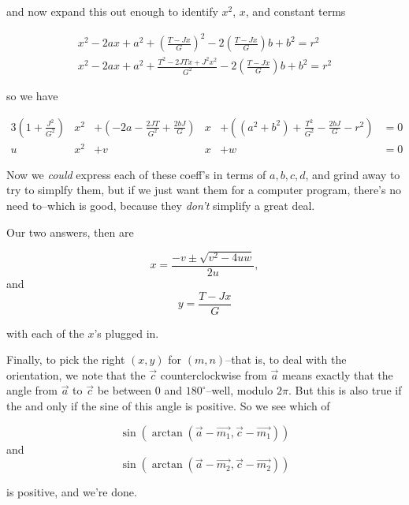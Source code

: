 \documentclass[12pt]{article}
\begin{document}
and now expand this out enough to identify $x^2$, $x$, and constant
terms

\begin{gather}
x^2-2ax+a^2+{\left(\frac{T-Jx}{G}\right)}^2
-2\left(\frac{T-Jx}{G}\right)b+b^2=r^2\\
x^2-2ax+a^2+\frac{T^2-2JTx+J^2x^2}{G^2}
-2\left(\frac{T-Jx}{G}\right)b+b^2=r^2
\end{gather}

so we have

\begin{alignat}{3}
\left(1+\frac{J^2}{G^2}\right)&x^2 & 
	+\left(-2a-\frac{2JT}{G^2}+\frac{2bJ}{G}\right)&x &
	+\left((a^2+b^2)+\frac{T^2}{G^2}-\frac{2bJ}{G}-r^2\right)& = 0\\
u&x^2 &+ v&x &+ w& = 0
\end{alignat}


Now we {\em could} express each of these coeff's in terms of $a,b,c,d$,
and grind away to try to simplfy them, but if we just want them for a
computer program, there's no need to--which is good, because they {\em
don't} simplify a great deal.

Our {\rm two} answers, then are

\begin{equation}
x = \frac{-v\pm\sqrt{v^2-4uw}}{2u},
\end{equation}
and
\begin{equation}
y = \frac{T-Jx}{G}
\end{equation}

with each of the $x$'s plugged in.

Finally, to pick the right $(x,y)$ for $(m,n)$--that is, to deal with
the orientation, we note that the $\vec{c}$ counterclockwise from
$\vec{a}$ means exactly that the angle from $\vec{a}$ to $\vec{c}$ be
between $0$ and ${180}^\circ$--well, modulo $2\pi$.  But this is also true
if the and only if the sine of this angle is positive.  So we see which
of

\begin{equation}
\sin(\arctan(\vec{a}-\vec{m_1},\vec{c}-\vec{m_1}))
\end{equation}
and
\begin{equation}
\sin(\arctan(\vec{a}-\vec{m_2},\vec{c}-\vec{m_2}))
\end{equation}

is positive, and we're done.
\end{document}
